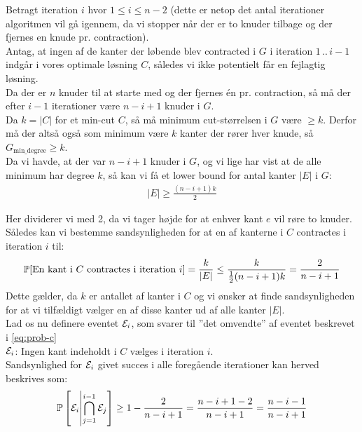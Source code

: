 Betragt iteration $i$ hvor $1 \leq i \leq n-2$ (dette er netop det antal iterationer algoritmen vil gå igennem, da vi stopper når der er to knuder tilbage og der fjernes en knude pr. contraction).\\


Antag, at ingen af de kanter der løbende blev contracted i $G$ i iteration $1 \, .. \, i-1$  indgår i vores optimale løsning $C$, således vi ikke potentielt får en fejlagtig løsning.\\

Da der er $n$ knuder til at starte med og der fjernes én pr. contraction, så må der efter $i-1$ iterationer være $n-i+1$ knuder i $G$.\\

Da $k = |C|$ for et min-cut $C$, så må minimum cut-størrelsen i $G$ være $\geq k$. Derfor må der altså også som minimum være $k$ kanter der rører hver knude, så $G_{\text{min\_degree}} \geq k$.\\

Da vi havde, at der var $n-i+1$ knuder i $G$, og vi lige har vist at de alle minimum har degree $k$, så kan vi få et lower bound for antal kanter $|E|$ i $G$:
\begin{align}
|E| \geq \frac{(n-i+1)k}{2}
\end{align}

Her dividerer vi med 2, da vi tager højde for at enhver kant $e$ vil røre to knuder.\\

Således kan vi bestemme sandsynligheden for at en af kanterne i $C$ contractes i iteration $i$ til:
\begin{align} \label{eq:prob-c}
\P[\text{En kant i $C$ contractes i iteration $i$}] = \frac{k}{|E|} \leq \frac{k}{\frac{1}{2}(n-i+1)k} = \frac{2}{n-i+1}
\end{align}
Dette gælder, da $k$ er antallet af kanter i $C$ og vi ønsker at finde sandsynligheden for at vi tilfældigt vælger en af disse kanter ud af alle kanter $|E|$.\\

Lad os nu definere eventet $\E_i$, som svarer til ''det omvendte'' af eventet beskrevet i \cref{eq:prob-c}\\
$\E_i$: Ingen kant indeholdt i $C$ vælges i iteration $i$.\\

Sandsynlighed for $\E_i$ givet succes i alle foregående iterationer kan herved beskrives som:
\begin{align} \label{eq:prob-succes-given-former-succes}
    \P \square{ \E_i \middle| \bigcap_{j=1}^{i-1} \E_j} \geq 1 - \frac{2}{n-i+1} = \frac{n-i+1-2}{n-i+1} = \frac{n-i-1}{n-i+1}
\end{align}



